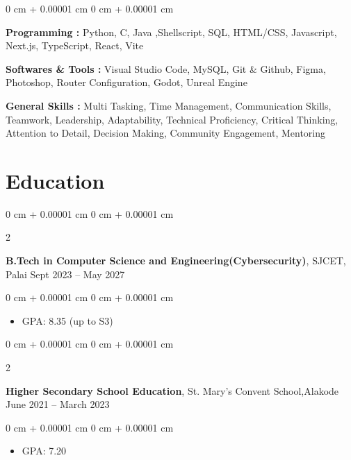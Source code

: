 \documentclass[10pt, letterpaper]{article}
\newenvironment{highlights}{
    \begin{itemize}[
        topsep=0.10 cm,
        parsep=0.10 cm,
        partopsep=0pt,
        itemsep=0pt,
        leftmargin=0 cm + 10pt
    ]
}{
    \end{itemize}
} %
\newenvironment{onecolentry}{
    \begin{adjustwidth}{
        0 cm + 0.00001 cm
    }{
        0 cm + 0.00001 cm
    }
}{
    \end{adjustwidth}
} %
\newenvironment{twocolentry}[2][]{
    \onecolentry
    \def\secondColumn{#2}
    \setcolumnwidth{\fill, 4.5 cm}
    \begin{paracol}{2}
}{
    \switchcolumn \raggedleft \secondColumn
    \end{paracol}
    \endonecolentry
} %
\begin{document}
    \begin{onecolentry}
        
        \textbf{Programming :} Python, C, Java ,Shellscript, SQL, HTML/CSS, Javascript, Next.js, TypeScript, React, Vite 

        \vspace{0.2 cm}

        \textbf{Softwares \& Tools :} Visual Studio Code, MySQL, Git \& Github, Figma, Photoshop, Router Configuration, Godot, Unreal Engine

        \vspace{0.2 cm}

        \textbf{General Skills :}  Multi Tasking, Time Management, Communication Skills, Teamwork, Leadership, Adaptability, Technical Proficiency, Critical Thinking, Attention to Detail, Decision Making, Community Engagement, Mentoring
        
    \end{onecolentry}

    \section{Education}

     
        \begin{twocolentry}{
            Sept 2023 – May 2027
        }
            \textbf{B.Tech in Computer Science and Engineering(Cybersecurity)},   SJCET, Palai\end{twocolentry}

        \vspace{0.10 cm}
        \begin{onecolentry}
            \begin{highlights}
                \item GPA: 8.35 (up to S3)
            \end{highlights}
        \end{onecolentry}

         \begin{twocolentry}{
            June 2021 – March 2023
        }
        
            \textbf{Higher Secondary School Education}, St. Mary's Convent School,Alakode\end{twocolentry}

        \vspace{0.10 cm}
        \begin{onecolentry}
            \begin{highlights}
                \item GPA: 7.20
            \end{highlights}
        \end{onecolentry}
\end{document}
